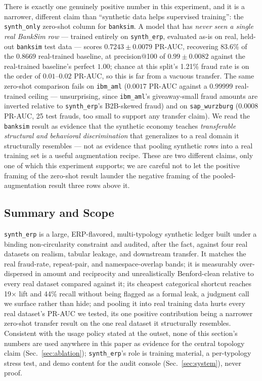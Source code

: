 There is exactly one genuinely positive number in this experiment, and it is
a narrower, different claim than ``synthetic data helps supervised
training'': the \texttt{synth\_only} zero-shot column for \texttt{banksim}.
A model that has \emph{never seen a single real BankSim row} — trained
entirely on \texttt{synth\_erp}, evaluated as-is on real, held-out
\texttt{banksim} test data — scores $0.7243\pm0.0079$ PR-AUC, recovering
83.6\% of the $0.8669$ real-trained baseline, at precision@100 of
$0.99\pm0.0082$ against the real-trained baseline's perfect $1.00$; chance at
this split's 1.21\% fraud rate is on the order of $0.01$--$0.02$ PR-AUC, so
this is far from a vacuous transfer. The same zero-shot comparison fails on
\texttt{ibm\_aml} ($0.0017$ PR-AUC against a $0.99999$ real-trained ceiling —
unsurprising, since \texttt{ibm\_aml}'s giveaway-small fraud amounts are
inverted relative to \texttt{synth\_erp}'s B2B-skewed fraud) and on
\texttt{sap\_wurzburg} ($0.0008$ PR-AUC, 25 test frauds, too small to support
any transfer claim). We read the \texttt{banksim} result as evidence that the
synthetic economy teaches \emph{transferable structural and behavioral
discrimination} that generalizes to a real domain it structurally resembles —
not as evidence that pooling synthetic rows into a real training set is a
useful augmentation recipe. These are two different claims, only one of which
this experiment supports; we are careful not to let the positive framing of
the zero-shot result launder the negative framing of the pooled-augmentation
result three rows above it.

\subsection{Summary and Scope}

\texttt{synth\_erp} is a large, ERP-flavored, multi-typology synthetic ledger
built under a binding non-circularity constraint and audited, after the fact,
against four real datasets on realism, tabular leakage, and downstream
transfer. It matches the real fraud-rate, repeat-pair, and namespace-overlap
bands; it is measurably over-dispersed in amount and reciprocity and
unrealistically Benford-clean relative to every real dataset compared against
it; its cheapest categorical shortcut reaches 19$\times$ lift and 44\% recall
without being flagged as a formal leak, a judgment call we surface rather
than hide; and pooling it into real training data hurts every real dataset's
PR-AUC we tested, its one positive contribution being a narrower zero-shot
transfer result on the one real dataset it structurally resembles.
Consistent with the usage policy stated at the outset, none of this
section's numbers are used anywhere in this paper as evidence for the
central topology claim (Sec.~\ref{sec:ablation}); \texttt{synth\_erp}'s role
is training material, a per-typology stress test, and demo content for the
audit console (Sec.~\ref{sec:system}), never proof.
